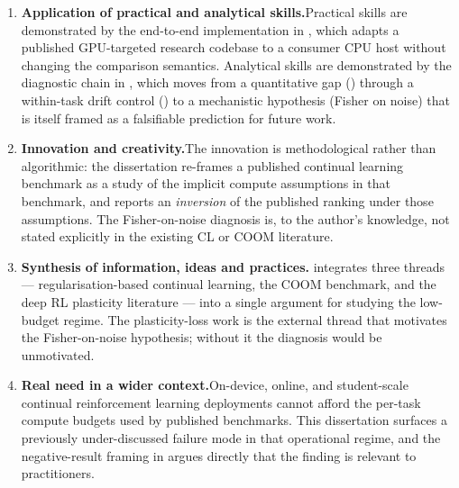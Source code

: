 \begin{enumerate}[label=\textbf{B\arabic*.},leftmargin=2.4em]
    \item \textbf{Application of practical and analytical
        skills.}\quad Practical skills are demonstrated by the
        end-to-end implementation in , which
        adapts a published GPU-targeted research codebase to a
        consumer CPU host without changing the comparison
        semantics. Analytical skills are demonstrated by the
        diagnostic chain in , which moves
        from a quantitative gap () through a
        within-task drift control () to a
        mechanistic hypothesis (Fisher on noise) that is itself
        framed as a falsifiable prediction for future work.

    \item \textbf{Innovation and creativity.}\quad The
        innovation is methodological rather than algorithmic:
        the dissertation re-frames a published continual
        learning benchmark as a study of the implicit compute
        assumptions in that benchmark, and reports an
        \emph{inversion} of the published ranking under those
        assumptions. The Fisher-on-noise diagnosis is, to the
        author's knowledge, not stated explicitly in the
        existing CL or COOM literature.

    \item \textbf{Synthesis of information, ideas and
        practices.}\quad {} integrates three
        threads --- regularisation-based continual learning,
        the COOM benchmark, and the deep RL plasticity
        literature --- into a single argument for studying the
        low-budget regime. The plasticity-loss work
        \citep{lyle2022plasticity, nikishin2022primacy} is the
        external thread that motivates the Fisher-on-noise
        hypothesis; without it the diagnosis would be
        unmotivated.

    \item \textbf{Real need in a wider context.}\quad On-device,
        online, and student-scale continual reinforcement
        learning deployments cannot afford the per-task compute
        budgets used by published benchmarks. This dissertation
        surfaces a previously under-discussed failure mode in
        that operational regime, and the negative-result
        framing in  argues directly that the
        finding is relevant to practitioners.


\end{enumerate}
